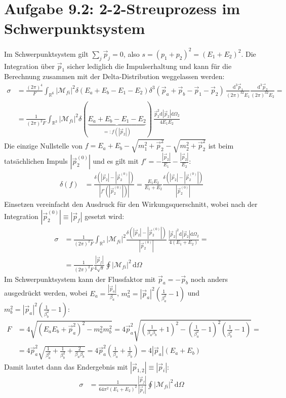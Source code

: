 \documentclass[a4paper,12pt]{article}
\newcommand{\intr}{}
\newcommand{\kla}{}
\begin{document}
\section*{Aufgabe 9.2: 2-2-Streuprozess im Schwerpunktsystem}
Im Schwerpunktsystem gilt $\sum_j\vec{p}_j=0$, also $s=(p_1+p_2)^2=(E_1+E_2)^2$. Die Integration über $\vec{p}_1$ sicher lediglich die Impulserhaltung und kann für die Berechnung zusammen mit der Delta-Distribution weggelassen werden:
\begin{align*}
\sigma &=\frac{(2\pi)^4}{F}\intr\int_{\mathbb{R}^{6}}{|\mathcal{M}_{fi}|^2\delta (E_a+E_b-E_1-E_2)\delta^3(\vec{p}_a+\vec{p}_b-\vec{p}_1-\vec{p}_2)}\,\frac{\mathrm{d}^{3}\vec{p}_1}{(2\pi)^32E_1}\frac{\mathrm{d}^{3}\vec{p}_2}{(2\pi)^32E_2}=\\
&=\frac{1}{(2\pi)^2F}\intr\int_{\mathbb{R}^{3}}{|\mathcal{M}_{fi}|^2\delta (\underbrace{E_a+E_b-E_1-E_2}_{=:f(|\vec{p}_2|)})}\,\frac{\vec{p}_2^2\mathrm{d}^{ }|\vec{p}_2|\mathrm{d}\Omega_2}{4E_1E_2}
\end{align*}
Die einzige Nullstelle von $f=E_a+E_b-\sqrt{m_1^2+\vec{p}_2^2}-\sqrt{m_2^2+\vec{p}_2^2}$ ist beim tatsächlichen Impuls $|\vec{p}_2^{(0)}|$ und es gilt mit $f'=-\frac{|\vec{p}_2|}{E_1}-\frac{|\vec{p}_2|}{E_2}$:
\begin{align*}
\delta(f)&=\frac{\delta(|\vec{p}_2|-|\vec{p}_2^{(0)}|)}{|f'(|\vec{p}_2^{(0)}|)|}=\frac{E_1E_2}{E_1+E_2}\frac{\delta(|\vec{p}_2|-|\vec{p}_2^{(0)}|)}{|\vec{p}_2^{(0)}|}
\end{align*}
Einsetzen vereinfacht den Ausdruck für den Wirkungsquerschnitt, wobei nach der Integration $|\vec{p}_2^{(0)}|\equiv |\vec{p}_f|$ gesetzt wird:
\begin{align*}
\sigma &=\frac{1}{(2\pi)^2F}\intr\int_{\mathbb{R}^{3}}{|\mathcal{M}_{fi}|^2\frac{\delta(|\vec{p}_2|-|\vec{p}_2^{(0)}|)}{|\vec{p}_2^{(0)}|}}\,\frac{|\vec{p}_2|^2\mathrm{d}^{ }|\vec{p}_2|\mathrm{d}\Omega_2}{4(E_1+E_2)}=\\
&=\frac{1}{(2\pi)^2F}\frac{|\vec{p}_f|}{4\sqrt{s}}\oint |\mathcal{M}_{fi}|^2\,\mathrm{d}\Omega
\end{align*}
Im Schwerpunktsystem kann der Flussfaktor mit $\vec{p}_a=-\vec{p}_b$ noch anders ausgedrückt werden, wobei $E_a=\frac{|\vec{p}_a|}{\beta_a}$, $m_a^2=|\vec{p}_a|^2\kla\left( {\frac{1}{\beta_a^2}-1} \right)$ und $m_b^2=|\vec{p}_a|^2\kla\left( {\frac{1}{\beta_b^2}-1} \right)$:
\begin{align*}
F&=4\sqrt{(E_aE_b+\vec{p}_a^2)^2-m_a^2m_b^2}=4\vec{p}_a^2\sqrt{\kla\left( {\frac{1}{\beta_a\beta_b}+1} \right)^2-\kla\left( {\frac{1}{\beta_a^2}-1} \right)^2\kla\left( {\frac{1}{\beta_b^2}-1} \right)}=\\
&=4\vec{p}_a^2\sqrt{\frac{1}{\beta_a^2}+\frac{1}{\beta_b^2}+\frac{2}{\beta_a\beta_b}}=4\vec{p}_a^2\kla\left( {\frac{1}{\beta_a}+\frac{1}{\beta_b}} \right)=4|\vec{p}_a|(E_a+E_b)
\end{align*}
Damit lautet dann das Endergebnis mit $|\vec{p}_{1,2}|\equiv |\vec{p}_i|$:
\begin{align*}
\sigma &=\frac{1}{64\pi^2(E_1+E_2)^2}\frac{|\vec{p}_f|}{|\vec{p}_i|}\oint |\mathcal{M}_{fi}|^2\,\mathrm{d}\Omega
\end{align*}
\end{document}
